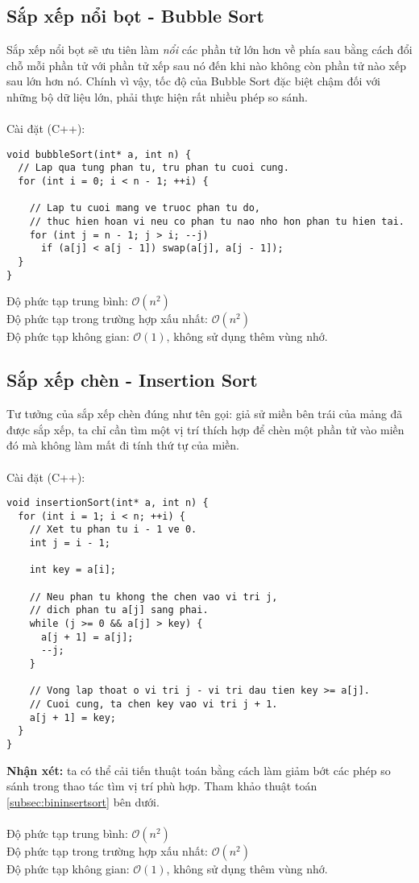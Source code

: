 \documentclass[]{article}
\begin{document}
\subsection{Sắp xếp nổi bọt - Bubble Sort}
Sắp xếp nổi bọt sẽ ưu tiên làm \textit{nổi} các phần tử lớn hơn về phía sau bằng cách đổi chỗ mỗi phần tử với phần tử xếp sau nó đến khi nào không còn phần tử nào xếp sau lớn hơn nó. Chính vì vậy, tốc độ của Bubble Sort đặc biệt chậm đối với những bộ dữ liệu lớn, phải thực hiện rất nhiều phép so sánh.
\\\\
Cài đặt (C++):
\begin{lstlisting}
void bubbleSort(int* a, int n) {
  // Lap qua tung phan tu, tru phan tu cuoi cung.
  for (int i = 0; i < n - 1; ++i) {

    // Lap tu cuoi mang ve truoc phan tu do,
    // thuc hien hoan vi neu co phan tu nao nho hon phan tu hien tai.
    for (int j = n - 1; j > i; --j)
      if (a[j] < a[j - 1]) swap(a[j], a[j - 1]);
  }
}
\end{lstlisting}
Độ phức tạp trung bình: $\mathcal{O}(n^2)$
\\
Độ phức tạp trong trường hợp xấu nhất: $\mathcal{O}(n^2)$
\\
Độ phức tạp không gian: $\mathcal{O}(1)$, không sử dụng thêm vùng nhớ.
\subsection{Sắp xếp chèn - Insertion Sort}
Tư tưởng của sắp xếp chèn đúng như tên gọi: giả sử miền bên trái của mảng đã được sắp xếp, ta chỉ cần tìm một vị trí thích hợp để chèn một phần tử vào miền đó mà không làm mất đi tính thứ tự của miền.
\\\\
Cài đặt (C++):
\begin{lstlisting}
void insertionSort(int* a, int n) {
  for (int i = 1; i < n; ++i) {
    // Xet tu phan tu i - 1 ve 0.
    int j = i - 1;

    int key = a[i];

    // Neu phan tu khong the chen vao vi tri j,
    // dich phan tu a[j] sang phai.
    while (j >= 0 && a[j] > key) {
      a[j + 1] = a[j];
      --j;
    }

    // Vong lap thoat o vi tri j - vi tri dau tien key >= a[j].
    // Cuoi cung, ta chen key vao vi tri j + 1.
    a[j + 1] = key;
  }
}
\end{lstlisting}
\textbf{Nhận xét:} ta có thể cải tiến thuật toán bằng cách làm giảm bớt các phép so sánh trong thao tác tìm vị trí phù hợp. Tham khảo thuật toán \ref{subsec:bininsertsort} bên dưới.
\\\\
Độ phức tạp trung bình: $\mathcal{O}(n^2)$
\\
Độ phức tạp trong trường hợp xấu nhất: $\mathcal{O}(n^2)$
\\
Độ phức tạp không gian: $\mathcal{O}(1)$, không sử dụng thêm vùng nhớ.
\end{document}
